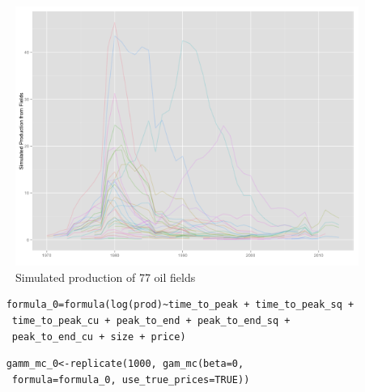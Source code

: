 \documentclass{beamer}
\begin{document}
\begin{frame}[plain]
	\begin{figure}
		\includegraphics[width=1\textwidth]{figures/simulated_production.png}
		\caption{Simulated production of 77 oil fields}
		\label{simulated_production}	
	\end{figure}
\end{frame}


\small \begin{frame}
	\small \begin{verbatim}
	formula_0=formula(log(prod)~time_to_peak + time_to_peak_sq +
	 time_to_peak_cu + peak_to_end + peak_to_end_sq + 
	 peak_to_end_cu + size + price)
	\end{verbatim}
\end{frame}

\begin{frame}
	\small \begin{verbatim}
	gamm_mc_0<-replicate(1000, gam_mc(beta=0,
	 formula=formula_0, use_true_prices=TRUE))
	\end{verbatim}
\end{frame}
\end{document}
